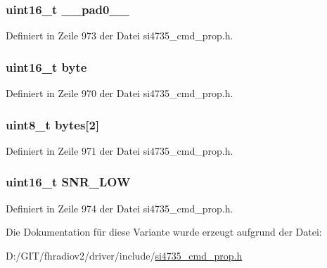 \subsubsection[{\+\_\+\+\_\+pad0\+\_\+\+\_\+}]{\setlength{\rightskip}{0pt plus 5cm}uint16\+\_\+t \+\_\+\+\_\+pad0\+\_\+\+\_\+}\label{unionfm__hicut__snr__low__thres_a77132c2c26a75f5b8751b235cda23828}


Definiert in Zeile 973 der Datei si4735\+\_\+cmd\+\_\+prop.\+h.

\hypertarget{unionfm__hicut__snr__low__thres_ab0549c1b5ea980a02e7eab77e21fea49}{}
\subsubsection[{byte}]{\setlength{\rightskip}{0pt plus 5cm}uint16\+\_\+t byte}\label{unionfm__hicut__snr__low__thres_ab0549c1b5ea980a02e7eab77e21fea49}


Definiert in Zeile 970 der Datei si4735\+\_\+cmd\+\_\+prop.\+h.

\hypertarget{unionfm__hicut__snr__low__thres_a46e4c05d20a047ec169f60d3167e912e}{}
\subsubsection[{bytes}]{\setlength{\rightskip}{0pt plus 5cm}uint8\+\_\+t bytes\mbox{[}2\mbox{]}}\label{unionfm__hicut__snr__low__thres_a46e4c05d20a047ec169f60d3167e912e}


Definiert in Zeile 971 der Datei si4735\+\_\+cmd\+\_\+prop.\+h.

\hypertarget{unionfm__hicut__snr__low__thres_a085d572271ee279f8aa41b68466f752c}{}
\subsubsection[{S\+N\+R\+\_\+\+L\+O\+W}]{\setlength{\rightskip}{0pt plus 5cm}uint16\+\_\+t S\+N\+R\+\_\+\+L\+O\+W}\label{unionfm__hicut__snr__low__thres_a085d572271ee279f8aa41b68466f752c}


Definiert in Zeile 974 der Datei si4735\+\_\+cmd\+\_\+prop.\+h.



Die Dokumentation für diese Variante wurde erzeugt aufgrund der Datei\+:\begin{DoxyCompactItemize}
\item 
D\+:/\+G\+I\+T/fhradiov2/driver/include/\hyperlink{si4735__cmd__prop_8h}{si4735\+\_\+cmd\+\_\+prop.\+h}\end{DoxyCompactItemize}
